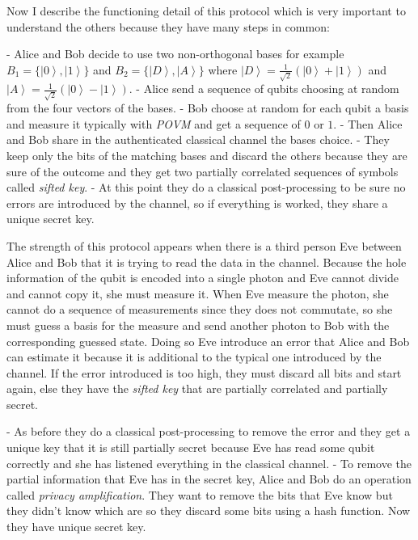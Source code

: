 Now I describe the functioning detail of this protocol which is very important to understand the others because they have many steps in common:

- Alice and Bob decide to use two non-orthogonal bases for example $B_1 = \{\left|0\right>, \left|1\right>\}$ and $B_2 = \{\left|D\right>, \left|A\right>\}$ where $\left|D\right> = \frac{1}{\sqrt{2}} (\left|0\right> + \left|1\right>)$ and $\left|A\right> = \frac{1}{\sqrt{2}} (\left|0\right> - \left|1\right>)$.
- Alice send a sequence of qubits choosing at random from the four vectors of the bases.
- Bob choose at random for each qubit a basis and measure it typically with \textit{POVM} and get a sequence of $0$ or $1$.
- Then Alice and Bob share in the authenticated classical channel the bases choice.
- They keep only the bits of the matching bases and discard the others because they are sure of the outcome and they get two partially correlated sequences of symbols called \textit{sifted key}.
- At this point they do a classical post-processing to be sure no errors are introduced by the channel, so if everything is worked, they share a unique secret key.

The strength of this protocol appears when there is a third person Eve between Alice and Bob that it is trying to read the data in the channel. Because the hole information of the qubit is encoded into a single photon and Eve cannot divide and cannot copy it, she must measure it. When Eve measure the photon, she cannot do a sequence of measurements since they does not commutate, so she must guess a basis for the measure and send another photon to Bob with the corresponding guessed state. Doing so Eve introduce an error that Alice and Bob can estimate it because it is additional to the typical one introduced by the channel. If the error introduced is too high, they must discard all bits and start again, else they have the \textit{sifted key} that are partially correlated and partially secret.

- As before they do a classical post-processing to remove the error and they get a unique key that it is still partially secret because Eve has read some qubit correctly and she has listened everything in the classical channel.
- To remove the partial information that Eve has in the secret key, Alice and Bob do an operation called \textit{privacy amplification}. They want to remove the bits that Eve know but they didn't know which are so they discard some bits using a hash function. Now they have unique secret key.

